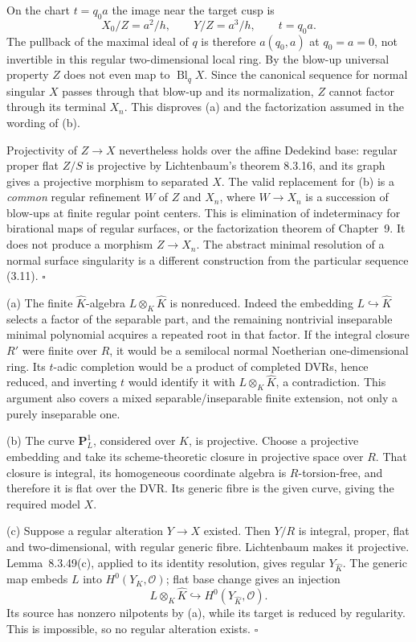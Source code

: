 \documentclass[11pt]{article}
\let\chapterexercise\exercise
\renewcommand{\exercise}[2]{\Needspace{8\baselineskip}\chapterexercise{#1}{#2}}
\begin{document}
On the chart $t=q_0a$ the image near the target cusp is
\[ X_0/Z=a^2/h,\qquad Y/Z=a^3/h,\qquad t=q_0a. \]
The pullback of the maximal ideal of $q$ is therefore $a(q_0,a)$ at $q_0=a=0$, not invertible in this regular two-dimensional local ring. By the blow-up universal property $Z$ does not even map to $\operatorname{Bl}_qX$. Since the canonical sequence for normal singular $X$ passes through that blow-up and its normalization, $Z$ cannot factor through its terminal $X_n$. This disproves (a) and the factorization assumed in the wording of (b).

Projectivity of $Z\to X$ nevertheless holds over the affine Dedekind base: regular proper flat $Z/S$ is projective by Lichtenbaum's theorem 8.3.16, and its graph gives a projective morphism to separated $X$. The valid replacement for (b) is a \emph{common} regular refinement $W$ of $Z$ and $X_n$, where $W\to X_n$ is a succession of blow-ups at finite regular point centers. This is elimination of indeterminacy for birational maps of regular surfaces, or the factorization theorem of Chapter~9. It does not produce a morphism $Z\to X_n$. The abstract minimal resolution of a normal surface singularity is a different construction from the particular sequence (3.11). \hfill$\square$

\pf
(a) The finite $\widehat K$-algebra $L\otimes_K\widehat K$ is nonreduced. Indeed the embedding $L\hookrightarrow\widehat K$ selects a factor of the separable part, and the remaining nontrivial inseparable minimal polynomial acquires a repeated root in that factor. If the integral closure $R'$ were finite over $R$, it would be a semilocal normal Noetherian one-dimensional ring. Its $t$-adic completion would be a product of completed DVRs, hence reduced, and inverting $t$ would identify it with $L\otimes_K\widehat K$, a contradiction. This argument also covers a mixed separable/inseparable finite extension, not only a purely inseparable one.

(b) The curve $\mathbf P^1_L$, considered over $K$, is projective. Choose a projective embedding and take its scheme-theoretic closure in projective space over $R$. That closure is integral, its homogeneous coordinate algebra is $R$-torsion-free, and therefore it is flat over the DVR. Its generic fibre is the given curve, giving the required model $X$.

(c) Suppose a regular alteration $Y\to X$ existed. Then $Y/R$ is integral, proper, flat and two-dimensional, with regular generic fibre. Lichtenbaum makes it projective. Lemma~8.3.49(c), applied to its identity resolution, gives regular $Y_{\widehat K}$. The generic map embeds $L$ into $H^0(Y_K,\mathcal O)$; flat base change gives an injection
\[ L\otimes_K\widehat K\hookrightarrow H^0(Y_{\widehat K},\mathcal O). \]
Its source has nonzero nilpotents by (a), while its target is reduced by regularity. This is impossible, so no regular alteration exists. \hfill$\square$
\end{document}
